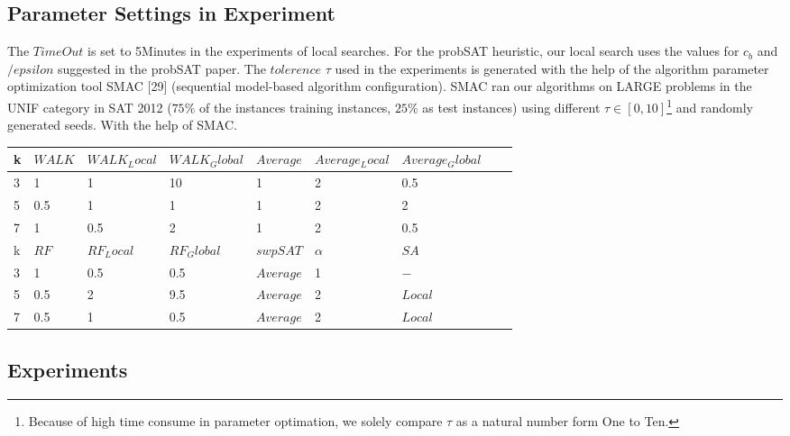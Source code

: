 \documentclass[12pt,a4paper,twoside]{scrartcl}
\numberwithin{equation}{section}
\begin{document}
\subsection{Parameter Settings in Experiment}
The $TimeOut$ is set to 5Minutes in the experiments of local searches.  For the probSAT heuristic, our local search uses the values for $c_b$ and $/epsilon$ suggested in the probSAT paper.  The $tolerence$ $ \tau$ used in the experiments is generated with the help of the algorithm parameter optimization tool SMAC [29] (sequential model-based algorithm configuration). SMAC ran our algorithms on LARGE problems in the UNIF category in SAT 2012 ($75\%$ of the instances training instances,  $25\%$ as test instances) using different   $ \tau \in [0, 10]$\footnote{Because of high time consume in parameter optimation, we solely compare $\tau$  as a natural number form One to Ten.}  and randomly generated seeds. With the help of SMAC.
   \begin{table}[H]
\begin{center}
    \begin{tabular}{|l|l|l|l||l|l|l|l|p{1cm}|}
\hline 

    k &$WALK$&$WALK_Local$&$WALK_Global$&$Average$&$Average_Local$&$Average_Global$ \\ \hline
    3 & 1& 1 & 10 &  1 & 2& 0.5       \\ \hline  
    5 & 0.5& 1 & 1&  1 & 2& 2 \\ \hline  
    7 & 1& 0.5 & 2&  1 & 2& 0.5  \\ \hline  
 \hline  
    k &$RF$&$RF_Local$&$RF_Global$&$swpSAT$&$\alpha$&$SA$ \\ \hline  
    3 & 1& 0.5 & 0.5&$Average$ & 1 & $-$\\ \hline 
    5 & 0.5& 2& 9.5&$Average$& 2 & $Local$\\ \hline 
    7 & 0.5& 1& 0.5 &$Average$&2 & $Local$\\ \hline 

	
\end{tabular}
\end{center}
\end{table}
\subsection{Experiments}
\end{document}
